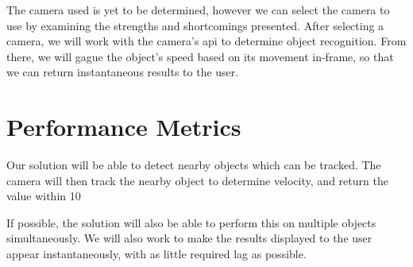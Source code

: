\documentclass[letterpaper,10pt,onecolumn,draftclsnofoot]{IEEEtran}
\begin{document}
The camera used is yet to be determined, however we can select the camera to use by examining the strengths and shortcomings presented.
After selecting a camera, we will work with the camera's api to determine object recognition.
From there, we will gague the object's speed based on its movement in-frame, so that we can return instantaneous results to the user.

\section{Performance Metrics}

Our solution will be able to detect nearby objects which can be tracked.
The camera will then track the nearby object to determine velocity, and return the value within 10%

If possible, the solution will also be able to perform this on multiple objects simultaneously.
We will also work to make the results displayed to the user appear instantaneously, with as little required lag as possible.


\end{document}
